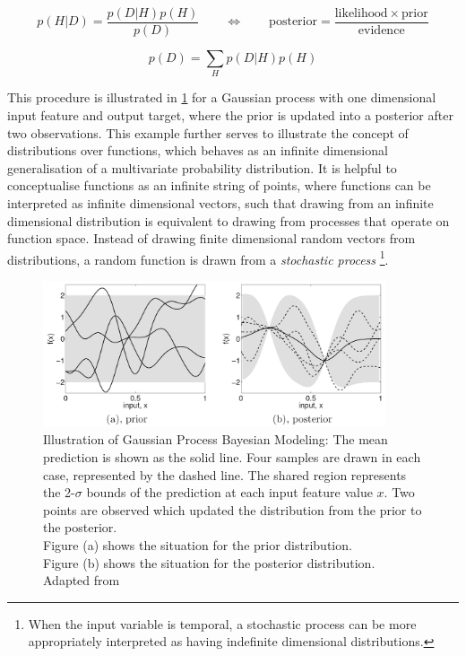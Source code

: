 			\begin{equation}
				p(H | D) = \frac{p(D | H) p(H)}{p(D)} \qquad \Longleftrightarrow \qquad \mathrm{posterior} = \frac{\mathrm{likelihood} \times \mathrm{prior}}{\mathrm{evidence}}
			\label{Equation:Bayes}
			\end{equation}
			
			\begin{equation}
				p(D) = \sum_{H} p(D | H) p(H)
			\label{Equation:MarginalLikelihood}
			\end{equation}			
			
			This procedure is illustrated in \cref{Figure:BayesianModeling} for a Gaussian process with one dimensional input feature and output target, where the prior is updated into a posterior after two observations. This example further serves to illustrate the concept of distributions over functions, which behaves as an infinite dimensional generalisation of a multivariate probability distribution. It is helpful to conceptualise functions as an infinite string of points, where functions can be interpreted as infinite dimensional vectors, such that drawing from an infinite dimensional distribution is equivalent to drawing from processes that operate on function space. Instead of drawing finite dimensional random vectors from distributions, a random function is drawn from a \textit{stochastic process} \footnote{When the input variable is temporal, a stochastic process can be more appropriately interpreted as having indefinite dimensional distributions.}.
			
			\begin{figure}[!htbp]
				\centering
					\includegraphics[width=0.9\textwidth]{Figures/bayesianmodeling.png}
				\caption{Illustration of Gaussian Process Bayesian Modeling: The mean prediction is shown as the solid line. Four samples are drawn in each case, represented by the dashed line. The shared region represents the 2-$\sigma$ bounds of the prediction at each input feature value $x$. Two points are observed which updated the distribution from the prior to the posterior.\\
				Figure (a) shows the situation for the prior distribution.\\
				Figure (b) shows the situation for the posterior distribution. \\
				Adapted from \cite{GaussianProcessForMachineLearning}}
				\label{Figure:BayesianModeling}
			\end{figure}
			
